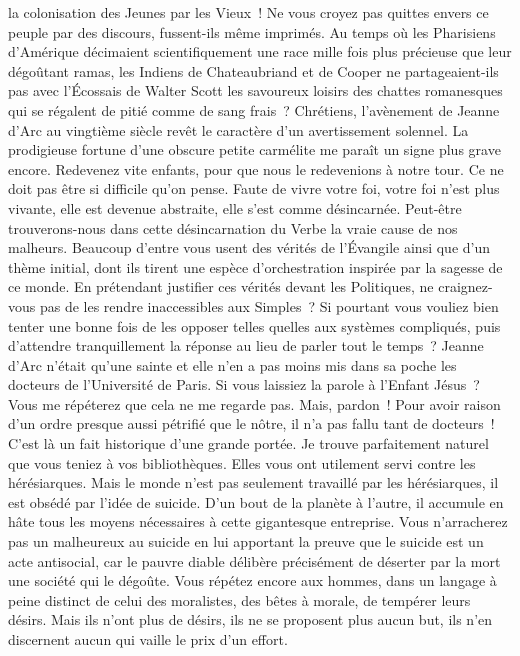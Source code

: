 \documentclass[french,twoside]{book} %
\begin{document}
la colonisation des Jeunes par les Vieux ! Ne vous croyez pas quittes envers ce peuple par des discours, fussent-ils même imprimés. Au temps où les Pharisiens d’Amérique décimaient scientifiquement une race mille fois plus précieuse que leur dégoûtant ramas, les Indiens de Chateaubriand et de Cooper ne partageaient-ils pas avec l’Écossais de Walter Scott les savoureux loisirs des chattes romanesques qui se régalent de pitié comme de sang frais ? Chrétiens, l’avènement de Jeanne d’Arc au vingtième siècle revêt le caractère d’un avertissement solennel. La prodigieuse fortune d’une obscure petite carmélite me paraît un signe plus grave encore. Redevenez vite enfants, pour que nous le redevenions à notre tour. Ce ne doit pas être si difficile qu’on pense. Faute de vivre votre foi, votre foi n’est plus vivante, elle est devenue abstraite, elle s’est comme désincarnée. Peut-être trouverons-nous dans cette désincarnation du Verbe la vraie cause de nos malheurs. Beaucoup d’entre vous usent des vérités de l’Évangile ainsi que d’un thème initial, dont ils tirent une espèce d’orchestration inspirée par la sagesse de ce monde. En prétendant justifier ces vérités devant les Politiques, ne craignez-vous pas de les rendre inaccessibles aux Simples ? Si pourtant vous vouliez bien tenter une bonne fois de les opposer telles quelles aux systèmes compliqués, puis d’attendre tranquillement la réponse au lieu de parler tout le temps ? Jeanne d’Arc n’était qu’une sainte et elle n’en a pas moins mis dans sa poche les docteurs de l’Université de Paris. Si vous laissiez la parole à l’Enfant Jésus ? Vous me répéterez que cela ne me regarde pas. Mais, pardon ! Pour avoir raison d’un ordre presque aussi pétrifié que le nôtre, il n’a pas fallu tant de docteurs ! C’est là un fait historique d’une grande portée. Je trouve parfaitement naturel que vous teniez à vos bibliothèques. Elles vous ont utilement servi contre les hérésiarques. Mais le monde n’est pas seulement travaillé par les hérésiarques, il est obsédé par l’idée de suicide. D’un bout de la planète à l’autre, il accumule en hâte tous les moyens nécessaires à cette gigantesque entreprise. Vous n’arracherez pas un malheureux au suicide en lui apportant la preuve que le suicide est un acte antisocial, car le pauvre diable délibère précisément de déserter par la mort une société qui le dégoûte. Vous répétez encore aux hommes, dans un langage à peine distinct de celui des moralistes, des bêtes à morale, de tempérer leurs désirs. Mais ils n’ont plus de désirs, ils ne se proposent plus aucun but, ils n’en discernent aucun qui vaille le prix d’un effort.\par
\end{document}
